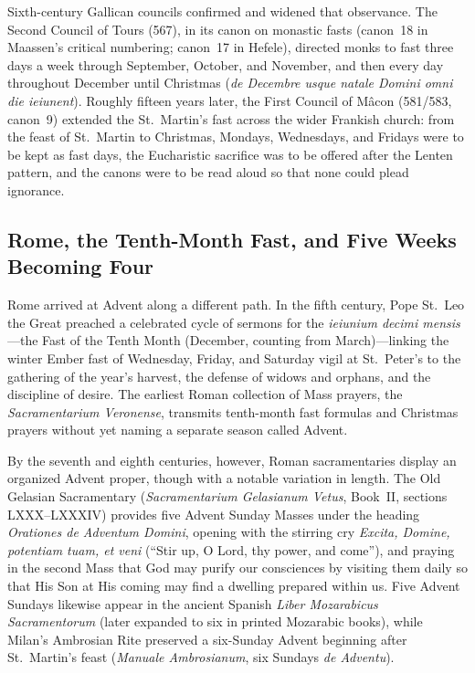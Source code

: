 Sixth-century Gallican councils confirmed and widened that observance. The Second Council of Tours (567), in its canon on monastic fasts (canon~18 in Maassen's critical numbering; canon~17 in Hefele), directed monks to fast three days a week through September, October, and November, and then every day throughout December until Christmas (\textit{de Decembre usque natale Domini omni die ieiunent}). Roughly fifteen years later, the First Council of M\^acon (581/583, canon~9) extended the St.~Martin's fast across the wider Frankish church: from the feast of St.~Martin to Christmas, Mondays, Wednesdays, and Fridays were to be kept as fast days, the Eucharistic sacrifice was to be offered after the Lenten pattern, and the canons were to be read aloud so that none could plead ignorance.

\subsection{Rome, the Tenth-Month Fast, and Five Weeks Becoming Four}

Rome arrived at Advent along a different path. In the fifth century, Pope St.~Leo the Great preached a celebrated cycle of sermons for the \textit{ieiunium decimi mensis}---the Fast of the Tenth Month (December, counting from March)---linking the winter Ember fast of Wednesday, Friday, and Saturday vigil at St.~Peter's to the gathering of the year's harvest, the defense of widows and orphans, and the discipline of desire. The earliest Roman collection of Mass prayers, the \textit{Sacramentarium Veronense}, transmits tenth-month fast formulas and Christmas prayers without yet naming a separate season called Advent.

By the seventh and eighth centuries, however, Roman sacramentaries display an organized Advent proper, though with a notable variation in length. The Old Gelasian Sacramentary (\textit{Sacramentarium Gelasianum Vetus}, Book~II, sections LXXX--LXXXIV) provides five Advent Sunday Masses under the heading \textit{Orationes de Adventum Domini}, opening with the stirring cry \textit{Excita, Domine, potentiam tuam, et veni} (``Stir up, O Lord, thy power, and come''), and praying in the second Mass that God may purify our consciences by visiting them daily so that His Son at His coming may find a dwelling prepared within us. Five Advent Sundays likewise appear in the ancient Spanish \textit{Liber Mozarabicus Sacramentorum} (later expanded to six in printed Mozarabic books), while Milan's Ambrosian Rite preserved a six-Sunday Advent beginning after St.~Martin's feast (\textit{Manuale Ambrosianum}, six Sundays \textit{de Adventu}).

